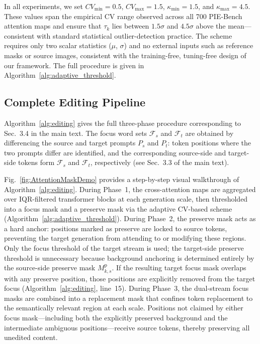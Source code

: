 In all experiments, we set $\mathit{CV}_{\min}{=}0.5$, $\mathit{CV}_{\max}{=}1.5$, $\kappa_{\min}{=}1.5$, and $\kappa_{\max}{=}4.5$. These values span the empirical CV range observed across all 700 PIE-Bench attention maps and ensure that $\tau_k$ lies between $1.5\sigma$ and $4.5\sigma$ above the mean---consistent with standard statistical outlier-detection practice.
The scheme requires only two scalar statistics ($\mu$, $\sigma$) and no external inputs such as reference masks or source images, consistent with the training-free, tuning-free design of our framework.
The full procedure is given in Algorithm~\ref{alg:adaptive_threshold}.



\subsection{Complete Editing Pipeline}
\label{sec:supp_pipeline}

Algorithm~\ref{alg:editing} gives the full three-phase procedure corresponding to Sec.~3.4 in the main text.
The focus word sets $\mathcal{F}_s$ and $\mathcal{F}_t$ are obtained by differencing the source and target prompts $P_s$ and $P_t$: token positions where the two prompts differ are identified, and the corresponding source-side and target-side tokens form $\mathcal{F}_s$ and $\mathcal{F}_t$, respectively (see Sec.~3.3 of the main text).



Fig.~\ref{fig:AttentionMaskDemo} provides a step-by-step visual walkthrough of Algorithm~\ref{alg:editing}.
During Phase~1, the cross-attention maps are aggregated over IQR-filtered transformer blocks at each generation scale, then thresholded into a focus mask and a preserve mask via the adaptive CV-based scheme (Algorithm~\ref{alg:adaptive_threshold}).
During Phase~2, the preserve mask acts as a hard anchor: positions marked as preserve are locked to source tokens, preventing the target generation from attending to or modifying these regions. Only the focus threshold of the target stream is used; the target-side preserve threshold is unnecessary because background anchoring is determined entirely by the source-side preserve mask $M_{k,s}^{\mathrm{p}}$. If the resulting target focus mask overlaps with any preserve position, those positions are explicitly removed from the target focus (Algorithm~\ref{alg:editing}, line~15).
During Phase~3, the dual-stream focus masks are combined into a replacement mask that confines token replacement to the semantically relevant region at each scale. Positions not claimed by either focus mask---including both the explicitly preserved background and the intermediate ambiguous positions---receive source tokens, thereby preserving all unedited content.
    
